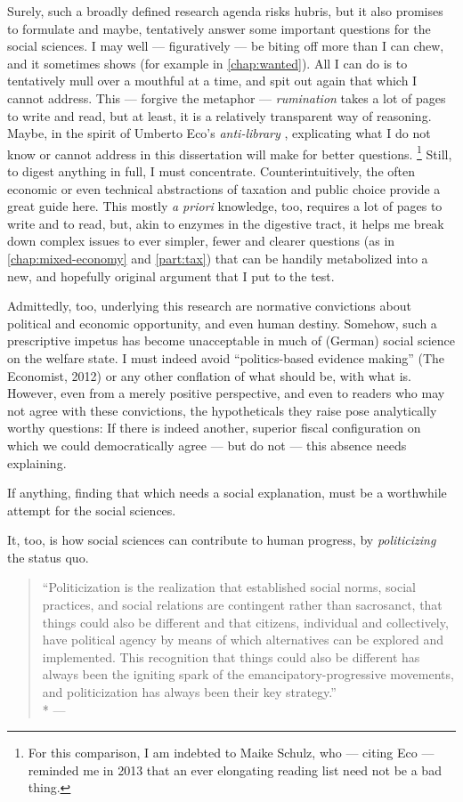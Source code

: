 Surely, such a broadly defined research agenda risks hubris, but it also promises to formulate and maybe, tentatively answer some important questions for the social sciences.
I may well --- figuratively --- be biting off more than I can chew, and it sometimes shows (for example in \autoref{chap:wanted}).
All I can do is to tentatively mull over a mouthful at a time, and spit out again that which I cannot address.
This --- forgive the metaphor --- \emph{rumination} takes a lot of pages to write and read, but at least, it is a relatively transparent way of reasoning.
Maybe, in the spirit of Umberto Eco's \emph{anti-library} \citep[as recounted in][]{Taleb2007}, explicating what I do not know or cannot address in this dissertation will make for better questions.
\footnote{
	For this comparison, I am indebted to Maike Schulz, who --- citing Eco --- reminded me in 2013 that an ever elongating reading list need not be a bad thing.
}
Still, to digest anything in full, I must concentrate.
Counterintuitively, the often economic or even technical abstractions of taxation and public choice provide a great guide here.
This mostly \emph{a priori} knowledge, too, requires a lot of pages to write and to read, but, akin to enzymes in the digestive tract, it helps me break down complex issues to ever simpler, fewer and clearer questions (as in \autoref{chap:mixed-economy} and \autoref{part:tax}) that can be handily metabolized into a new, and hopefully original argument that I put to the test.

Admittedly, too, underlying this research are normative convictions about political and economic opportunity, and even human destiny.
Somehow, such a prescriptive impetus has become unacceptable in much of (German) social science on the welfare state.
I must indeed avoid ``politics-based evidence making'' (The Economist, 2012) %
or any other conflation of what should be, with what is.
However, even from a merely positive perspective, and even to readers who may not agree with these convictions, the hypotheticals they raise pose analytically worthy questions:
If there is indeed another, superior fiscal configuration on which we could democratically agree --- but do not --- this absence needs explaining.

If anything, finding that which needs a social explanation, must be a worthwhile attempt for the social sciences.

It, too, is how social sciences can contribute to human progress, by \emph{politicizing} the status quo.
\begin{quote}
	``Politicization is the realization that established social norms, social practices, and social relations are contingent rather than sacrosanct, that things could also be different and that citizens, individual and collectively, have political agency by means of which alternatives can be explored and implemented.
	This recognition that things could also be different has always been the igniting spark of the emancipatory-progressive movements, and politicization has always been their key strategy.''
	\\*
 	--- \citet[313]{Bluhdorn-2007-aa}
\end{quote}


